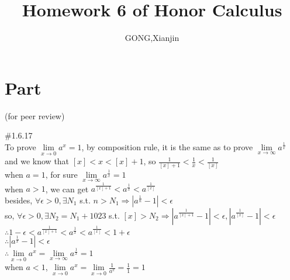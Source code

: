 \documentclass{article}
\author{GONG,Xianjin}
\title{Homework 6 of Honor Calculus}
\begin{document}
\maketitle

\section{\textcolor[rgb]{0.70,0.00,0.00}{Part \uppercase\expandafter{}}}(for peer review)

\vspace{3.5mm}

\textcolor[rgb]{0.00,0.00,0.50}{\#1.6.17}\\

To prove $\lim \limits_{x \to 0}a^x=1$, by composition rule, it is the same as to prove $\displaystyle\lim \limits_{x \to \infty}a^{\frac{1}{x}}$\\

and we know that $[x]<x<[x]+1$, so $\displaystyle\frac{1}{[x]+1}<\frac{1}{x}<\frac{1}{[x]}$\\

when $a=1$, for sure $\displaystyle\lim \limits_{x \to \infty}a^{\frac{1}{x}}=1$\\

when $a>1$, we can get $\displaystyle a^{\frac{1}{[x]+1}}<a^{\frac{1}{x}}<a^{\frac{1}{[x]}}$\\

besides, $\forall\epsilon>0, \exists N_1$ s.t. $\displaystyle n>N_1\Rightarrow\left|a^{\frac{1}{n}}-1\right|<\epsilon$\\

so, $\forall\epsilon>0, \exists N_2=N_1+1023$ s.t. $\displaystyle [x]>N_2\Rightarrow\left|a^{\frac{1}{[x]+1}}-1\right|<\epsilon,  \left|a^{\frac{1}{[x]}}-1\right|<\epsilon$\\

$\therefore$\qquad$\displaystyle 1-\epsilon<a^{\frac{1}{[x]+1}}<a^{\frac{1}{x}}<a^{\frac{1}{[x]}}<1+\epsilon$\\

$\therefore$\qquad$\displaystyle \left|a^{\frac{1}{x}}-1\right|<\epsilon$\\

$\therefore$\qquad$\displaystyle \lim \limits_{x \to 0}a^x=\lim \limits_{x \to \infty}a^{\frac{1}{x}}=1$\\

when $a<1$, $\lim \limits_{x \to 0}a^x=\lim \limits_{x \to 0}\displaystyle\frac{1}{a^x}=\frac{1}{1}=1$\\
\end{document}
